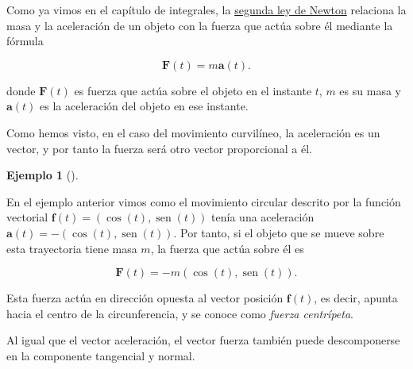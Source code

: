 \documentclass[
  a4paper,
]{scrreport}
\theoremstyle{definition}
\newtheorem{example}{Ejemplo}[chapter]
\theoremstyle{plain}
\theoremstyle{plain}
\theoremstyle{definition}
\theoremstyle{plain}
\theoremstyle{remark}
\begin{document}
Como ya vimos en el capítulo de integrales, la
\href{https://es.wikipedia.org/wiki/Leyes_de_Newton\#Segunda_ley_de_Newton_o_ley_fundamental_de_la_din\%C3\%A1mica}{segunda
ley de Newton} relaciona la masa y la aceleración de un objeto con la
fuerza que actúa sobre él mediante la fórmula

\[
\mathbf{F}(t) = m\mathbf{a}(t).
\]

donde \(\mathbf{F}(t)\) es fuerza que actúa sobre el objeto en el
instante \(t\), \(m\) es su masa y \(\mathbf{a}(t)\) es la aceleración
del objeto en ese instante.

Como hemos visto, en el caso del movimiento curvilíneo, la aceleración
es un vector, y por tanto la fuerza será otro vector proporcional a él.

\begin{example}[]\protect\hypertarget{exm-fuerza-centrípeta}{}\label{exm-fuerza-centrípeta}

En el ejemplo anterior vimos como el movimiento circular descrito por la
función vectorial \(\mathbf{f}(t) = (\cos(t),\operatorname{sen}(t))\)
tenía una aceleración
\(\mathbf{a}(t) = -(\cos(t), \operatorname{sen}(t))\). Por tanto, si el
objeto que se mueve sobre esta trayectoria tiene masa \(m\), la fuerza
que actúa sobre él es

\[
\mathbf{F}(t) = -m(\cos(t), \operatorname{sen}(t)).
\]

Esta fuerza actúa en dirección opuesta al vector posición
\(\mathbf{f}(t)\), es decir, apunta hacia el centro de la
circunferencia, y se conoce como \emph{fuerza centrípeta}.

\end{example}

Al igual que el vector aceleración, el vector fuerza también puede
descomponerse en la componente tangencial y normal.
\end{document}
